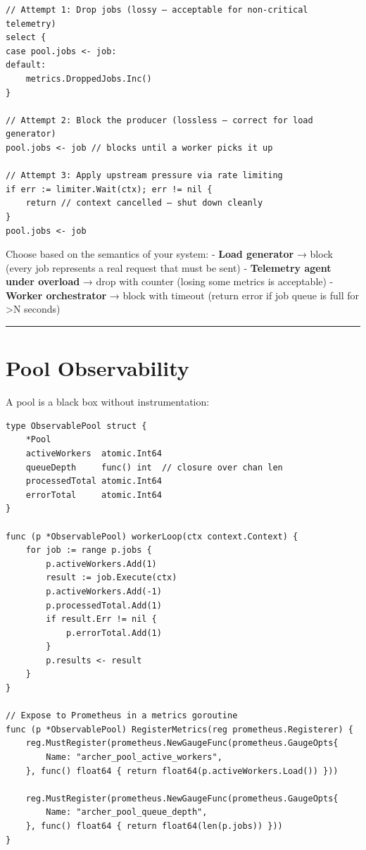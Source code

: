 \documentclass[11pt,a4paper,oneside]{book}
\begin{document}
\begin{verbatim}
// Attempt 1: Drop jobs (lossy — acceptable for non-critical telemetry)
select {
case pool.jobs <- job:
default:
    metrics.DroppedJobs.Inc()
}

// Attempt 2: Block the producer (lossless — correct for load generator)
pool.jobs <- job // blocks until a worker picks it up

// Attempt 3: Apply upstream pressure via rate limiting
if err := limiter.Wait(ctx); err != nil {
    return // context cancelled — shut down cleanly
}
pool.jobs <- job
\end{verbatim}

Choose based on the semantics of your system: - \textbf{Load generator}
→ block (every job represents a real request that must be sent) -
\textbf{Telemetry agent under overload} → drop with counter (losing some
metrics is acceptable) - \textbf{Worker orchestrator} → block with
timeout (return error if job queue is full for \textgreater N seconds)

\begin{center}\rule{0.5\linewidth}{0.5pt}\end{center}

\section{Pool Observability}

A pool is a black box without instrumentation:

\begin{verbatim}
type ObservablePool struct {
    *Pool
    activeWorkers  atomic.Int64
    queueDepth     func() int  // closure over chan len
    processedTotal atomic.Int64
    errorTotal     atomic.Int64
}

func (p *ObservablePool) workerLoop(ctx context.Context) {
    for job := range p.jobs {
        p.activeWorkers.Add(1)
        result := job.Execute(ctx)
        p.activeWorkers.Add(-1)
        p.processedTotal.Add(1)
        if result.Err != nil {
            p.errorTotal.Add(1)
        }
        p.results <- result
    }
}

// Expose to Prometheus in a metrics goroutine
func (p *ObservablePool) RegisterMetrics(reg prometheus.Registerer) {
    reg.MustRegister(prometheus.NewGaugeFunc(prometheus.GaugeOpts{
        Name: "archer_pool_active_workers",
    }, func() float64 { return float64(p.activeWorkers.Load()) }))

    reg.MustRegister(prometheus.NewGaugeFunc(prometheus.GaugeOpts{
        Name: "archer_pool_queue_depth",
    }, func() float64 { return float64(len(p.jobs)) }))
}
\end{verbatim}
\end{document}
